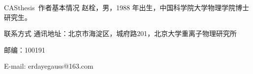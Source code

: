 
\begin{resume}

\begin{resumesection}{CASthesis~作者基本情况}
赵栓，男，1988 年出生，中国科学院大学物理学院博士研究生。
\end{resumesection}

\begin{resumelist}{联系方式}
通讯地址：北京市海淀区，城府路201，北京大学重离子物理研究所

邮编：100191

E-mail: erdayegauss@163.com
\end{resumelist}
\end{resume}
